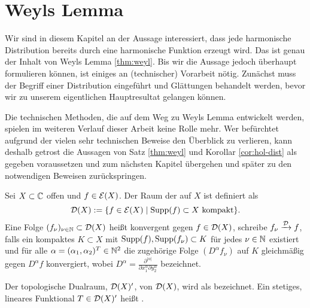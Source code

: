 
\section{Weyls Lemma}
\label{sec:Weyl}

Wir sind in diesem Kapitel an der Aussage interessiert, dass jede
harmonische Distribution bereits durch eine harmonische Funktion
erzeugt wird. Das ist genau der Inhalt von Weyls Lemma
\ref{thm:weyl}. Bis wir die Aussage jedoch überhaupt formulieren
können, ist einiges an (technischer) Vorarbeit nötig. Zunächst muss
der Begriff einer Distribution eingeführt und Glättungen behandelt
werden, bevor wir zu unserem eigentlichen Hauptresultat gelangen
können.

Die technischen Methoden, die auf dem Weg zu Weyls Lemma entwickelt
werden, spielen im weiteren Verlauf dieser Arbeit keine Rolle
mehr. Wer befürchtet aufgrund der vielen sehr technischen Beweise den
Überblick zu verlieren, kann deshalb getrost die Aussagen von Satz
\ref{thm:weyl} und Korollar \ref{cor:hol-dist} als gegeben
voraussetzen und zum nächsten Kapitel übergehen und später zu den
notwendigen Beweisen zurückspringen.

\begin{defin}
  Sei $X \subset \mathbb{C}$ offen und $f \in \mathcal{E}(X)$.
  Der Raum der  auf $X$ ist definiert als
  \[
  \mathcal{D}(X) := \{ f \in \mathcal{E}(X) \mid \operatorname{Supp}(f) \subset X \text{ kompakt} \}.
  \]
  Eine Folge $(f_\nu)_{\nu \in \mathbb{N}} \subset \mathcal{D}(X)$ heißt konvergent
  gegen $f \in \mathcal{D}(X)$, schreibe $f_\nu \xrightarrow{\mathcal{D}} f$,
  falls ein kompaktes $K \subset X$ mit $\operatorname{Supp}(f), \operatorname{Supp}(f_\nu)
  \subset K$ für jedes $\nu \in \mathbb{N}$ existiert und für alle $\alpha = (\alpha_1,
  \alpha_2)^T \in \mathbb{N}^2$ die zugehörige Folge $(D^\alpha f_\nu)$ auf
  $K$ gleichmäßig gegen $D^\alpha f$ konvergiert, wobei $D^\alpha = \frac{\partial^{|\alpha|}}{\partial
    x^\alpha_1 \partial y^\alpha_2}$ bezeichnet.
\end{defin}

\begin{defin}[Distribution]
  Der topologische Dualraum, $\mathcal{D}(X)'$, von $\mathcal{D}(X)$, wird als
   bezeichnet. Ein stetiges, lineares
  Funktional $T \in \mathcal{D}(X)'$ heißt .
\end{defin}

